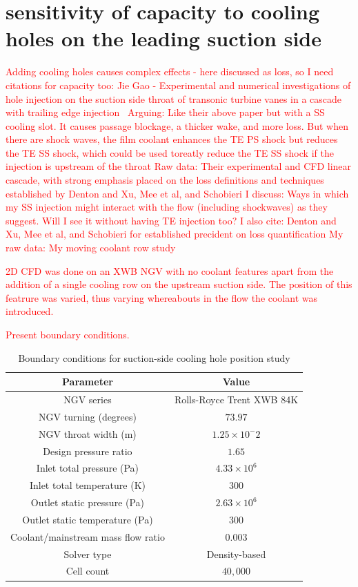 \documentclass[a4paper, 11pt, twoside]{report}
\begin{document}
 
\section{sensitivity of capacity to cooling holes on the leading suction side}

\textcolor{red}{Adding cooling holes causes complex effects - here discussed as loss, so I need citations for capacity too:}
\textcolor{red}{Jie Gao - Experimental and numerical investigations of hole injection on the suction side throat of transonic turbine vanes in a cascade with trailing edge injection~\cite{gao_te_and_film_cooling}}
		\textcolor{red}{Arguing: Like their above paper but with a SS cooling slot. It causes passage blockage, a thicker wake, and more loss. But when there are shock waves, the film coolant enhances the TE PS shock but reduces the TE SS shock, which could be used toreatly reduce the TE SS shock if the injection is upstream of the throat}
		\textcolor{red}{Raw data: Their experimental and CFD linear cascade, with strong emphasis placed on the loss definitions and techniques established by Denton and Xu, Mee et al, and Schobieri}
		\textcolor{red}{I discuss: Ways in which my SS injection might interact with the flow (including shockwaves) as they suggest. Will I see it without having TE injection too?}
		\textcolor{red}{I also cite: Denton and Xu, Mee et al, and Schobieri for established precident on loss quantification}
		\textcolor{red}{My raw data: My moving coolant row study}

\textcolor{red}{2D CFD was done on an XWB NGV with no coolant features apart from the addition of a single cooling row on the upstream suction side. The position of this featrure was varied, thus varying whereabouts in the flow the coolant was introduced.}

\textcolor{red}{Present boundary conditions.}
\begin{table}[H]
\caption{Boundary conditions for suction-side cooling hole position study}
\label{SCH_parameters}
\begin{center}
\begin{tabular}{|c|c|}
\hline
Parameter & Value\\
\hline
NGV series & Rolls-Royce Trent XWB 84K\\
NGV turning (degrees) & $73.97$\\
NGV throat width (m) & $1.25 \times 10^-2$\\
Design pressure ratio & $1.65$\\
Inlet total pressure (Pa) & $4.33 \times 10^6$\\
Inlet total temperature (K) & $300$\\
Outlet static pressure (Pa) & $2.63 \times 10^6$\\
Outlet static temperature (Pa) & $300$\\
Coolant/mainstream mass flow ratio & $0.003$\\
Solver type & Density-based\\
Cell count & $40,000$\\
\hline
\end{tabular}
\end{center}
\end{table}
\end{document}
